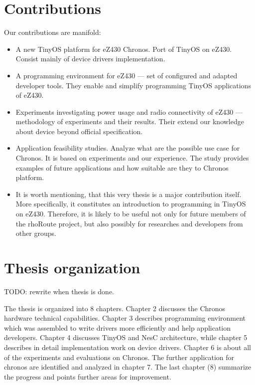 \section{Contributions}
Our contributions are manifold:
\begin{itemize}
  \item A new TinyOS platform for eZ430 Chronos. Port of TinyOS on eZ430. Consist mainly of device drivers implementation.
  \item A programming environment for eZ430 --- set of configured and adapted developer tools. They enable and simplify programming TinyOS applications of eZ430.
  \item Experiments investigating power usage and radio connectivity of eZ430 --- methodology of experiments and their results. Their extend our knowledge about device beyond official specification.
  \item Application feasibility studies. Analyze what are the possible use case for Chronos. It is based on experiments and our experience. The study provides examples of future applications and how suitable are they to Chronos platform.
  \item It is worth mentioning, that this very thesis is a major contribution itself. More specifically, it constitutes an introduction to programming in TinyOS on eZ430. Therefore, it is likely to be useful not only for future members of the rhoRoute project, but also possibly for researches and developers from other groups.
\end{itemize}

\section{Thesis organization}
TODO: rewrite when thesis is done.

The thesis is organized into 8 chapters. Chapter 2 discusses the Chronos hardware technical capabilities. Chapter 3 describes programming environment which was assembled to write drivers more efficiently and help application developers. Chapter 4 discusses TinyOS and NesC architecture, while chapter 5 describes in detail implementation work on device drivers. Chapter 6 is about all of the experiments and evaluations on Chronos. The further application for chronos are identified and analyzed in chapter 7. The last chapter (8) summarize the progress and points further areas for improvement.
